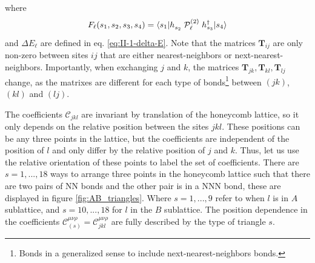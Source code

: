 where
\begin{equation}
    F_{\ell}(s_1,s_2,s_3,s_4) = \braket{ s_1 | h_{s_2}^{\phantom{\dagger}} \; \mathcal{P}_{\ell}^{(2)} \; h_{s_3}^{\dagger} | s_4 }
\end{equation}
and $\Delta E_\ell$ are defined in eq. \eqref{eq:II-1-delta-E}.
Note that the matrices $\mathbf{T}_{ij}$ are only non-zero between sites $ij$ that are either nearest-neighbors or next-nearest-neighbors.
Importantly, when exchanging $j$ and $k$, the matrices $\mathbf{T}_{jk}, \mathbf{T}_{kl}, \mathbf{T}_{lj}$ change, as the matrixes are different for each type of bonds\footnote{Bonds in a generalized sense to include next-nearest-neighbors bonds.} between $(jk)$, $(kl)$ and $(lj)$.


The coefficients $\mathcal{C}_{jkl}$ are invariant by translation of the honeycomb lattice, so it only depends on the relative position between the sites $jkl$. These positions can be any three points in the lattice, but the coefficients are independent of the position of $l$ and only differ by the relative position of $j$ and $k$.
Thus, let us use the relative orientation of these points to label the set of coefficients. There are $s=1, ..., 18$ ways to arrange three points in the honeycomb lattice such that there are two pairs of NN bonds and the other pair is in a NNN bond, these are displayed in figure \ref{fig:AB_triangles}.
Where $s=1, ..., 9$ refer to when $l$ is in $A$ sublattice, and $s=10, ..., 18$ for $l$ in the $B$ sublattice. The position dependence in the coefficients $\mathcal{C}_{(s)}^{\mu\nu\rho}=\mathcal{C}_{jkl}^{\mu\nu\rho}$ are fully described by the type of triangle $s$.

